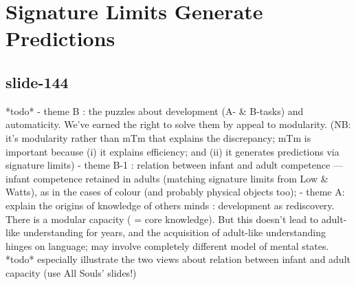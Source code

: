 \documentclass[12pt,\papersize]{extarticle}
\begin{document}
\section{Signature Limits Generate Predictions}
 
 
\subsection{slide-144}
*todo*
- theme B : the puzzles about development (A- \& B-tasks) and automaticity. We've earned the right to solve them by appeal to modularity. (NB: it's modularity rather than mTm that explains the discrepancy; mTm is important because (i) it explains efficiency; and (ii) it generates predictions via signature limits)
- theme B-1 : relation between infant and adult competence --- infant competence retained in adults (matching signature limits from Low \& Watts), as in the cases of colour (and probably physical objects too);
- theme A: explain the origins of knowledge of others minds : development as rediscovery. There is a modular capacity ( = core knowledge). But this doesn't lead to adult-like understanding for years, and the acquisition of adult-like understanding hinges on language; may involve completely different model of mental states.
*todo* especially illustrate the two views about relation between infant and adult capacity (use All Souls' slides!)




 






\end{document}

